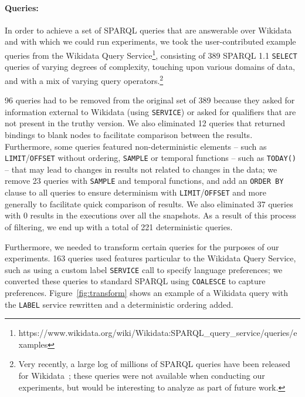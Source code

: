 \documentclass[runningheads]{llncs}
\begin{document}

\paragraph{Queries:} In order to achieve a set of SPARQL queries that are answerable over Wikidata and with which we could run experiments, we took the user-contributed example queries from the Wikidata Query Service\footnote{https://www.wikidata.org/wiki/Wikidata:SPARQL\_query\_service/queries/examples}, consisting of 389 SPARQL 1.1 \texttt{SELECT} queries of varying degrees of complexity, touching upon various domains of data, and with a mix of varying query operators.\footnote{Very recently, a large log of millions of SPARQL queries have been released for Wikidata~\cite{MalyshevKGGB18}; these queries were not available when conducting our experiments, but would be interesting to analyze as part of future work.}

96 queries had to be removed from the original set of 389 because they asked for information external to Wikidata (using \texttt{SERVICE}) or asked for qualifiers that are not present in the truthy version. We also eliminated 12 queries that returned bindings to blank nodes to facilitate comparison between the results. Furthermore, some queries featured non-deterministic elements -- such as \texttt{LIMIT}/\texttt{OFFSET} without ordering, \texttt{SAMPLE} or temporal functions -- such as \texttt{TODAY()} -- that may lead to changes in results not related to changes in the data; we remove 23 queries with \texttt{SAMPLE} and temporal functions, and add an \texttt{ORDER BY} clause to all queries to ensure determinism with \texttt{LIMIT}/\texttt{OFFSET} and more generally to facilitate quick comparison of results. We also eliminated 37 queries with 0 results in the executions over all the snapshots. As a result of this process of filtering, we end up with a total of 221 deterministic queries.

Furthermore, we needed to transform certain queries for the purposes of our experiments. 163 queries used features particular to the Wikidata Query Service, such as using a custom label \texttt{SERVICE} call to specify language preferences; we converted these queries to standard SPARQL using \texttt{COALESCE} to capture preferences.  Figure~\ref{fig:transform} shows an example of a Wikidata query with the \texttt{LABEL} service rewritten and a deterministic ordering added. 
\end{document}
